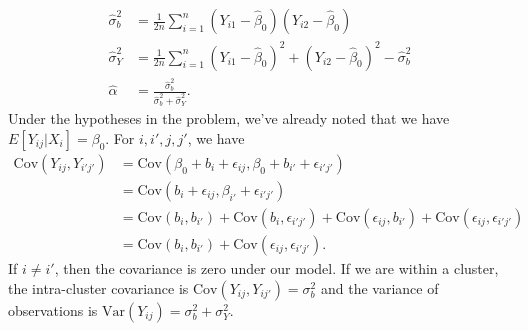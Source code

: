 \documentclass[11pt]{article}
\newcommand{\Var}{\mathrm{Var}}
\newcommand{\Cov}{\mathrm{Cov}}
\begin{document}
\begin{enumerate}
	\begin{align*}
		\widehat{\sigma}^2_b &= \frac{1}{2n}\sum_{i=1}^n (Y_{i1}-\widehat{\beta}_0)(Y_{i2}-\widehat{\beta}_0) \\
		\widehat{\sigma}^2_Y &= \frac{1}{2n}\sum_{i=1}^n(Y_{i1}-\widehat{\beta}_0)^2+(Y_{i2} - \widehat{\beta}_0)^2 - \widehat{\sigma}^2_b \\
		\widehat{\alpha} &= \frac{\widehat{\sigma}^2_b}{\widehat{\sigma}^2_b+\widehat{\sigma}^2_Y}.
	\end{align*}
	Under the hypotheses in the problem, we've already noted that we have $E[Y_{ij}|X_i] = \beta_0$. For $i,i',j,j'$, we have
	\begin{align*}
		\Cov(Y_{ij},Y_{i'j'}) &= \Cov(\beta_0 + b_i + \epsilon_{ij}, \beta_0 + b_{i'} + \epsilon_{i'j'}) \\
		&= \Cov(b_i + \epsilon_{ij}, \beta_{i'} + \epsilon_{i'j'}) \\
		&= \Cov(b_i,b_{i'}) + \Cov(b_i,\epsilon_{i'j'}) + \Cov(\epsilon_{ij},b_{i'}) + \Cov(\epsilon_{ij},\epsilon_{i'j'})\\
		&= \Cov(b_i,b_{i'})+ \Cov(\epsilon_{ij},\epsilon_{i'j'}).
		\end{align*}
		If $i\neq i'$, then the covariance is zero under our model. If we are within a cluster, the intra-cluster covariance is $\Cov(Y_{ij},Y_{ij'}) = \sigma^2_b$ and the variance of observations is $\Var(Y_{ij}) = \sigma^2_b + \sigma^2_Y$.\\
	

\end{enumerate}
\end{document}
